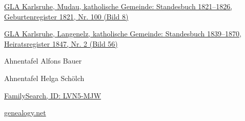 \begin{person}[
    surname = {Münch},
    givenname = {Anna Maria},
    suffix = {1821--1891},
    label = {@I147@}
    ]
\begin{enumerate}[label={[\arabic*]}]
\item \href{http://www.landesarchiv-bw.de/plink/?f=4-1119445-8}{GLA Karlsruhe, Mudau, katholische Gemeinde: Standesbuch 1821–1826, Geburtenregister 1821, Nr. 100 (Bild 8)}
\item \href{http://www.landesarchiv-bw.de/plink/?f=4-1119438-56}{GLA Karlsruhe, Langenelz, katholische Gemeinde: Standesbuch 1839–1870, Heiratsregister 1847, Nr. 2 (Bild 56)}
\item Ahnentafel Alfons Bauer
\item Ahnentafel Helga Schölch
\item \href{https://www.familysearch.org/tree/person/details/LVN5-MJW}{FamilySearch, ID: LVN5-MJW}
\item \href{http://gedbas.genealogy.net/person/show/1172977599}{genealogy.net}
\end{enumerate}

\end{person}


